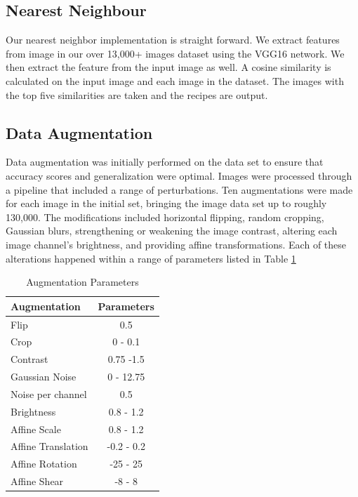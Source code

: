 \documentclass[10pt,twocolumn,letterpaper]{article}
\begin{document}
\subsection{Nearest Neighbour}
Our nearest neighbor implementation is straight forward. We extract features from image in our over 13,000+ images dataset using the VGG16 network.
We then extract the feature from the input image as well. A cosine similarity is calculated on the input image and each image in the dataset. The images with the top five similarities are taken and the recipes are output.

\subsection{Data Augmentation}
 Data augmentation was initially performed on the data set to ensure that accuracy scores and generalization were optimal. Images were processed through a pipeline that included a range of perturbations. Ten augmentations were made for each image in the initial set, bringing the image data set up to roughly 130,000. The modifications included horizontal flipping, random cropping, Gaussian blurs, strengthening or weakening the image contrast, altering each image channel's brightness, and providing affine transformations. Each of these alterations happened within a range of parameters listed in  Table \ref{tab:augParams}
 \begin{table}
\begin{center}
\begin{tabular}{|l|c|}
\hline
Augmentation & Parameters \\
\hline\hline
Flip & 0.5 \\
Crop &  0 - 0.1 \\
Contrast &  0.75 -1.5 \\
Gaussian Noise &  0 - 12.75 \\
Noise per channel &  0.5 \\
Brightness &  0.8 - 1.2 \\
Affine Scale &  0.8 - 1.2 \\
Affine Translation &  -0.2 - 0.2 \\
Affine Rotation &  -25 - 25 \\
Affine Shear &  -8 - 8 \\
\hline
\end{tabular}
\end{center}
\caption{Augmentation Parameters}
\label{tab:augParams}
\end{table}
\end{document}
